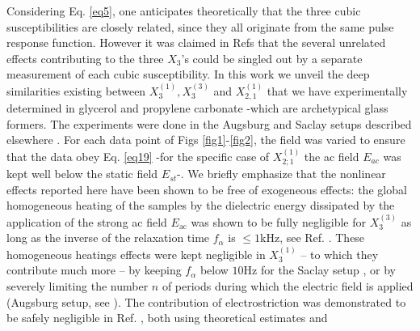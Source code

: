 \documentclass[single column,pre]{revtex4}
\begin{document}
Considering Eq. \ref{eq5}, one anticipates theoretically that the three cubic susceptibilities are closely related, since they all originate from the same pulse response function. However it was claimed in Refs \cite{Ric16a,Ric16b} that the several unrelated effects contributing to the three $X_3$'s could be singled out by a separate measurement of each cubic susceptibility. In this work we unveil the deep similarities existing between $X_3^{(1)}, X_3^{(3)}$ and $X_{2,1}^{(1)}$ that we have experimentally determined in glycerol and propylene carbonate -which are archetypical glass formers. 
The experiments were done in the Augsburg and Saclay setups described elsewhere \cite{Alb16,Bau13,Bru11}. For each data point of Figs \ref{fig1}-\ref{fig2}, the field was varied to ensure that the data obey Eq. \ref{eq19} -for the specific case of $X_{2;1}^{(1)}$ the ac field $E_{ac}$ was kept well below the static field $E_{st}$-. We briefly emphasize that the nonlinear effects reported here 
have been shown to be free of exogeneous effects: the global homogeneous heating of the samples by the dielectric energy dissipated by the application of the strong ac field $E_{\text{ac}}$ was shown to be fully negligible for $X_3^{(3)}$ as long as the inverse of the relaxation time $f_{\alpha}$ is $\le 1$kHz, see Ref. \cite{Bru10}. These homogeneous heatings effects were kept negligible in $X_3^{(1)}$ -- to which they contribute much more -- by keeping $f_{\alpha}$ below $10$Hz for the Saclay setup \cite{Bru11}, or by severely limiting the number $n$ of periods during which the electric field is applied (Augsburg setup, see \cite{Sup13}). The contribution of electrostriction was demonstrated to be safely negligible in Ref. \cite{Bru11}, both using theoretical estimates and
\end{document}
